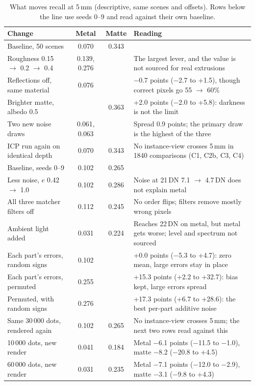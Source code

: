 \documentclass[10pt,a4paper]{article}
\begin{document}
\begin{table}[t]
\centering\footnotesize
\caption{What moves recall at 5\,mm (descriptive, same scenes and offsets). Rows below the line use seeds 0--9 and read against their own baseline.}\label{tab:moves}
\vspace{-1pt}
\begin{tabularx}{\textwidth}{@{}p{}ccX@{}}
\toprule
Change & Metal & Matte & Reading \\
\midrule
Baseline, 50 scenes & 0.070 & 0.343 & \\
Roughness 0.15 $\to$ 0.2 $\to$ 0.4 & 0.139, 0.276 & & The largest lever, and the value is not sourced for real extrusions \\
Reflections off, same material & 0.076 & & $-$0.7 points ($-$2.7 to +1.5), though correct pixels go 55 $\to$ 60\% \\
Brighter matte, albedo 0.5 & & 0.363 & +2.0 points ($-$2.0 to +5.8): darkness is not the limit \\
Two new noise draws & 0.061, 0.063 & & Spread 0.9 points; the primary draw is the highest of the three \\
ICP run again on identical depth & 0.070 & 0.343 & No instance-view crosses 5\,mm in 1840 comparisons (C1, C2b, C3, C4) \\
\midrule
Baseline, seeds 0--9 & 0.102 & 0.265 & \\
Less noise, $e$ 0.42 $\to$ 1.0 & 0.102 & 0.286 & Noise at 21\,DN 7.1 $\to$ 4.7\,DN does not explain metal \\
All three matcher filters off & 0.112 & 0.245 & No order flips; filters remove mostly wrong pixels \\
Ambient light added & 0.031 & 0.224 & Reaches 22\,DN on metal, but metal gets worse; level and spectrum not sourced \\
Each part's errors, random signs & 0.102 & & +0.0 points ($-$5.3 to +4.7): zero mean, large errors stay in place \\
Each part's errors, permuted & 0.255 & & +15.3 points (+2.2 to +32.7): bias kept, large errors spread \\
Permuted, with random signs & 0.276 & & +17.3 points (+6.7 to +28.6): the best per-part additive noise \\
Same 30\,000 dots, rendered again & 0.102 & 0.265 & No instance-view crosses 5\,mm; the next two rows read against this \\
10\,000 dots, new render & 0.041 & 0.184 & Metal $-$6.1 points ($-$11.5 to $-$1.0), matte $-$8.2 ($-$20.8 to +4.5) \\
60\,000 dots, new render & 0.031 & 0.235 & Metal $-$7.1 points ($-$12.0 to $-$2.9), matte $-$3.1 ($-$9.8 to +4.3) \\
\bottomrule
\end{tabularx}
\end{table}
\end{document}
